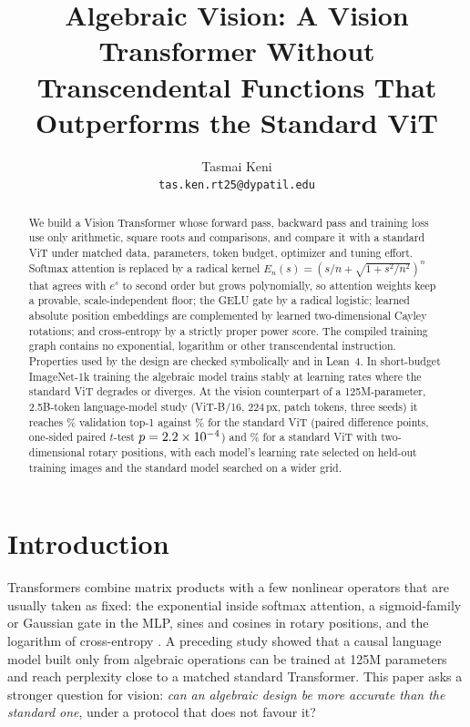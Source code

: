 \documentclass[10pt]{article}
\title{Algebraic Vision: A Vision Transformer Without Transcendental
Functions That Outperforms the Standard ViT}
\author{Tasmai Keni\\\texttt{tas.ken.rt25@dypatil.edu}}
\date{}
\begin{document}
\maketitle

\begin{abstract}
We build a Vision Transformer whose forward pass, backward pass and training
loss use only arithmetic, square roots and comparisons, and compare it with a
standard ViT under matched data, parameters, token budget, optimizer and
tuning effort. Softmax attention is replaced by a radical kernel
$E_n(s)=(s/n+\sqrt{1+s^2/n^2})^n$ that agrees with $e^s$ to second order but
grows polynomially, so attention weights keep a provable, scale-independent
floor; the GELU gate by a radical logistic; learned absolute position
embeddings are complemented by learned two-dimensional Cayley rotations; and
cross-entropy by a strictly proper power score. The compiled training graph
contains no exponential, logarithm or other transcendental instruction.
Properties used by the design are checked symbolically and in Lean~4. In
short-budget ImageNet-1k training the algebraic model trains stably at
learning rates where the standard ViT degrades or diverges. At the vision
counterpart of a 125M-parameter, 2.5B-token language-model study (ViT-B/16,
224\,px, \mainTokens{} patch tokens, three seeds) it reaches
\mainAlgVal\% validation top-1 against \mainStdVal\% for the standard ViT
(paired difference \mainDiff{} points, one-sided paired $t$-test
$p=2.2\times10^{-4}$) and \mainRopeVal\% for a standard ViT with two-dimensional
rotary positions, with each model's learning rate selected on held-out
training images and the standard model searched on a wider grid.
\end{abstract}

\section{Introduction}

Transformers combine matrix products with a few nonlinear operators that are
usually taken as fixed: the exponential inside softmax attention, a
sigmoid-family or Gaussian gate in the MLP, sines and cosines in rotary
positions, and the logarithm of cross-entropy
\cite{vaswani2017attention,dosovitskiy2021vit,hendrycks2016gelu,su2021roformer}.
A preceding study \cite{keni2026algebraic} showed that a causal language model
built only from algebraic operations can be trained at 125M parameters and
reach perplexity close to a matched standard Transformer. This paper asks a
stronger question for vision: \emph{can an algebraic design be more accurate
than the standard one}, under a protocol that does not favour it?
\end{document}

